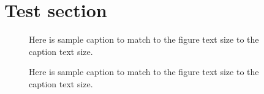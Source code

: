 \documentclass[aps,prb,twocolumn,superscriptaddress,amsmath]{revtex4-2}
\begin{document}
%
\section{Test section}


\begin{figure}[h]
    \centering
    
    \caption{Here is sample caption to match to the figure text size to the caption text size.}
\end{figure}
% 

\newpage

\begin{figure}
    \centering
    
    \caption{Here is sample caption to match to the figure text size to the caption text size.}
\end{figure}
\end{document}
